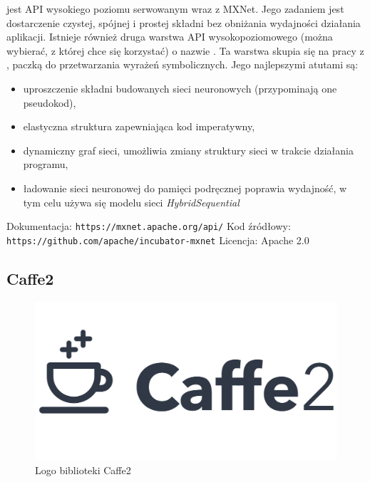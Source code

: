 \documentclass[12pt,a4paper,twoside,titlepage,openright]{book}
\begin{document}
\begin{itemize}
\begin{itemize}
 jest API wysokiego poziomu serwowanym wraz z MXNet. Jego zadaniem jest dostarczenie czystej, spójnej i prostej składni bez obniżania wydajności działania aplikacji. Istnieje również druga warstwa API wysokopoziomowego (można wybierać, z której chce się korzystać) o nazwie . Ta warstwa skupia się na pracy z , paczką do przetwarzania wyrażeń symbolicznych. \cite{DBLP:journals/corr/ChenLLLWWXXZZ15} Jego najlepszymi atutami są:
\begin{itemize}
\item uproszczenie składni budowanych sieci neuronowych (przypominają one pseudokod),
\item elastyczna struktura zapewniająca kod imperatywny,
\item dynamiczny graf sieci, umożliwia zmiany struktury sieci w trakcie działania programu,
\item ładowanie sieci neuronowej do pamięci podręcznej poprawia wydajność, w tym celu używa się modelu sieci \textit{HybridSequential}
\end{itemize}

\noindent 
\newline
Dokumentacja: \texttt{https://mxnet.apache.org/api/}
\newline
Kod źródłowy: \texttt{https://github.com/apache/incubator-mxnet}
\newline
Licencja: Apache 2.0

\subsection{Caffe2}
\begin{figure}[h]
	\centering
			\includegraphics[resolution=100, scale=0.35]{Caffe2.png}
		\caption{Logo biblioteki Caffe2}
\end{figure}


\end{itemize}
\end{itemize}
\end{document}
